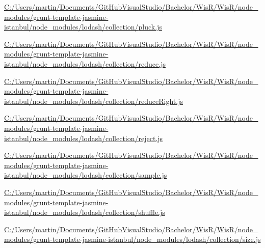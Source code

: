 \begin{DoxyCompactItemize}
\item 
\hyperlink{_c_1_2_users_2martin_2_documents_2_git_hub_visual_studio_2_bachelor_2_wis_r_2_wis_r_2node_module04d2c6aa97c6c0df05a78f7cbc9841af}{C\+:/\+Users/martin/\+Documents/\+Git\+Hub\+Visual\+Studio/\+Bachelor/\+Wis\+R/\+Wis\+R/node\+\_\+modules/grunt-\/template-\/jasmine-\/istanbul/node\+\_\+modules/lodash/collection/pluck.\+js}
\item 
\hyperlink{_c_1_2_users_2martin_2_documents_2_git_hub_visual_studio_2_bachelor_2_wis_r_2_wis_r_2node_moduleff50cf32c39f2ce61370996fadae1537}{C\+:/\+Users/martin/\+Documents/\+Git\+Hub\+Visual\+Studio/\+Bachelor/\+Wis\+R/\+Wis\+R/node\+\_\+modules/grunt-\/template-\/jasmine-\/istanbul/node\+\_\+modules/lodash/collection/reduce.\+js}
\item 
\hyperlink{_c_1_2_users_2martin_2_documents_2_git_hub_visual_studio_2_bachelor_2_wis_r_2_wis_r_2node_module224f0c38ca83683047fc56c9537d16ed}{C\+:/\+Users/martin/\+Documents/\+Git\+Hub\+Visual\+Studio/\+Bachelor/\+Wis\+R/\+Wis\+R/node\+\_\+modules/grunt-\/template-\/jasmine-\/istanbul/node\+\_\+modules/lodash/collection/reduce\+Right.\+js}
\item 
\hyperlink{_c_1_2_users_2martin_2_documents_2_git_hub_visual_studio_2_bachelor_2_wis_r_2_wis_r_2node_module24b6cc419a6a476b43580c632369e9ab}{C\+:/\+Users/martin/\+Documents/\+Git\+Hub\+Visual\+Studio/\+Bachelor/\+Wis\+R/\+Wis\+R/node\+\_\+modules/grunt-\/template-\/jasmine-\/istanbul/node\+\_\+modules/lodash/collection/reject.\+js}
\item 
\hyperlink{_c_1_2_users_2martin_2_documents_2_git_hub_visual_studio_2_bachelor_2_wis_r_2_wis_r_2node_module976fb4be8c54e3aff4b4ab6829a9eef2}{C\+:/\+Users/martin/\+Documents/\+Git\+Hub\+Visual\+Studio/\+Bachelor/\+Wis\+R/\+Wis\+R/node\+\_\+modules/grunt-\/template-\/jasmine-\/istanbul/node\+\_\+modules/lodash/collection/sample.\+js}
\item 
\hyperlink{_c_1_2_users_2martin_2_documents_2_git_hub_visual_studio_2_bachelor_2_wis_r_2_wis_r_2node_modulef7075f117e1574c8b2c6d3133a9ad85e}{C\+:/\+Users/martin/\+Documents/\+Git\+Hub\+Visual\+Studio/\+Bachelor/\+Wis\+R/\+Wis\+R/node\+\_\+modules/grunt-\/template-\/jasmine-\/istanbul/node\+\_\+modules/lodash/collection/shuffle.\+js}
\item 
\hyperlink{_c_1_2_users_2martin_2_documents_2_git_hub_visual_studio_2_bachelor_2_wis_r_2_wis_r_2node_moduleed708995e0a1fa347055d2e9540bc903}{C\+:/\+Users/martin/\+Documents/\+Git\+Hub\+Visual\+Studio/\+Bachelor/\+Wis\+R/\+Wis\+R/node\+\_\+modules/grunt-\/template-\/jasmine-\/istanbul/node\+\_\+modules/lodash/collection/size.\+js}

\end{DoxyCompactItemize}
